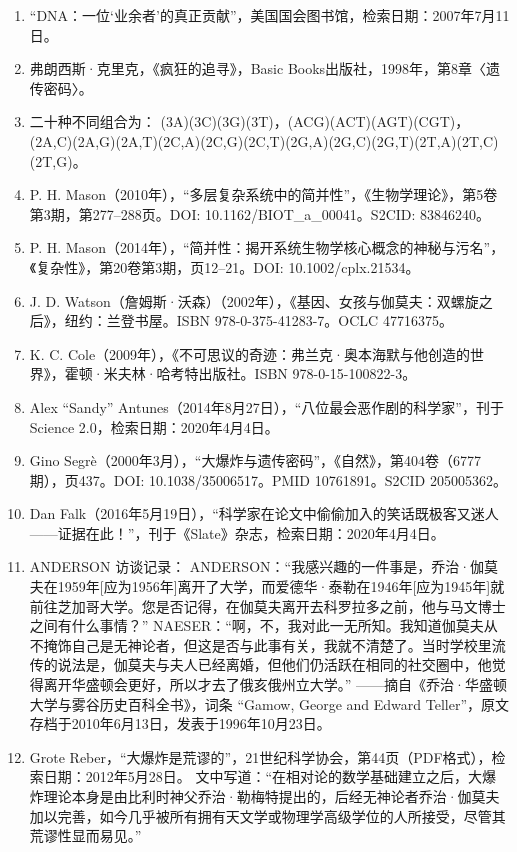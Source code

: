 \begin{enumerate}
\item “DNA：一位‘业余者’的真正贡献”，美国国会图书馆，检索日期：2007年7月11日。
\item 弗朗西斯·克里克，《疯狂的追寻》，Basic Books出版社，1998年，第8章〈遗传密码〉。
\item 二十种不同组合为：
  (3A)(3C)(3G)(3T)，(ACG)(ACT)(AGT)(CGT)，
  (2A,C)(2A,G)(2A,T)(2C,A)(2C,G)(2C,T)(2G,A)(2G,C)(2G,T)(2T,A)(2T,C)(2T,G)。
\item P. H. Mason（2010年），“多层复杂系统中的简并性”，《生物学理论》，第5卷第3期，第277–288页。DOI: 10.1162/BIOT_a_00041。S2CID: 83846240。
\item P. H. Mason（2014年），“简并性：揭开系统生物学核心概念的神秘与污名”，《复杂性》，第20卷第3期，页12–21。DOI: 10.1002/cplx.21534。
\item J. D. Watson（詹姆斯·沃森）（2002年），《基因、女孩与伽莫夫：双螺旋之后》，纽约：兰登书屋。ISBN 978-0-375-41283-7。OCLC 47716375。
\item K. C. Cole（2009年），《不可思议的奇迹：弗兰克·奥本海默与他创造的世界》，霍顿·米夫林·哈考特出版社。ISBN 978-0-15-100822-3。
\item Alex “Sandy” Antunes（2014年8月27日），“八位最会恶作剧的科学家”，刊于 Science 2.0，检索日期：2020年4月4日。
\item Gino Segrè（2000年3月），“大爆炸与遗传密码”，《自然》，第404卷（6777期），页437。DOI: 10.1038/35006517。PMID 10761891。S2CID 205005362。
\item Dan Falk（2016年5月19日），“科学家在论文中偷偷加入的笑话既极客又迷人——证据在此！”，刊于《Slate》杂志，检索日期：2020年4月4日。
\item ANDERSON 访谈记录：
  ANDERSON：“我感兴趣的一件事是，乔治·伽莫夫在1959年[应为1956年]离开了大学，而爱德华·泰勒在1946年[应为1945年]就前往芝加哥大学。您是否记得，在伽莫夫离开去科罗拉多之前，他与马文博士之间有什么事情？”
  NAESER：“啊，不，我对此一无所知。我知道伽莫夫从不掩饰自己是无神论者，但这是否与此事有关，我就不清楚了。当时学校里流传的说法是，伽莫夫与夫人已经离婚，但他们仍活跃在相同的社交圈中，他觉得离开华盛顿会更好，所以才去了俄亥俄州立大学。”
  ——摘自《乔治·华盛顿大学与雾谷历史百科全书》，词条 “Gamow, George and Edward Teller”，原文存档于2010年6月13日，发表于1996年10月23日。
\item Grote Reber，“大爆炸是荒谬的”，21世纪科学协会，第44页（PDF格式），检索日期：2012年5月28日。
  文中写道：“在相对论的数学基础建立之后，大爆炸理论本身是由比利时神父乔治·勒梅特提出的，后经无神论者乔治·伽莫夫加以完善，如今几乎被所有拥有天文学或物理学高级学位的人所接受，尽管其荒谬性显而易见。”

\end{enumerate}
